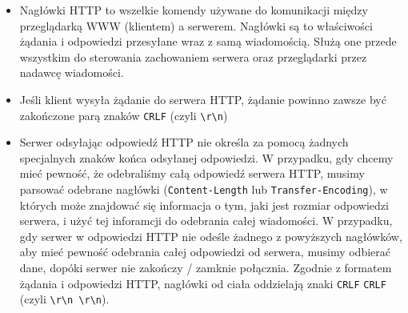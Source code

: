\begin{itemize}
\item Nagłówki HTTP to wszelkie komendy używane do komunikacji między przeglądarką WWW (klientem) a serwerem. Nagłówki są to właściwości żądania i odpowiedzi przesyłane wraz z samą wiadomością. Służą one przede wszystkim do sterowania zachowaniem serwera oraz przeglądarki przez nadawcę wiadomości.

\item Jeśli klient wysyła żądanie do serwera HTTP, żądanie powinno zawsze być zakończone parą znaków \texttt{CRLF}   (czyli \texttt{\textbackslash r\textbackslash n})
\item Serwer odsyłając odpowiedź HTTP nie określa za pomocą żadnych specjalnych znaków końca odsyłanej odpowiedzi. W przypadku, gdy chcemy mieć pewność, że odebraliśmy całą odpowiedź serwera HTTP, musimy parsować odebrane nagłówki  (\texttt{Content-Length} lub \texttt{Transfer-Encoding}), w których może znajdować się informacja o tym, jaki jest rozmiar odpowiedzi serwera, i użyć tej inforamcji do odebrania całej wiadomości. W przypadku, gdy serwer w odpowiedzi HTTP nie odeśle żadnego z powyższych nagłówków, aby mieć pewność odebrania całej odpowiedzi od serwera, musimy odbierać dane, dopóki serwer nie zakończy / zamknie połącznia. Zgodnie z formatem żądania i odpowiedzi HTTP, nagłówki od ciała oddzielają znaki \texttt{CRLF} \texttt{CRLF} (czyli \texttt{\textbackslash r\textbackslash n \textbackslash r\textbackslash n}).

\end{itemize}

\newpage 
{} \\

